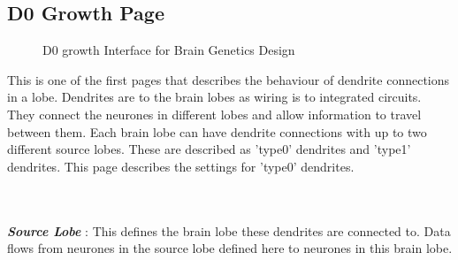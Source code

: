 \documentclass[11pt,twoside,a4paper]{article}
\begin{document}
\subsection{D0 Growth Page}

\begin{minipage}{0.6\linewidth}
\begin{figure}[H]
	\centerline {} %
	\caption{D0 growth Interface for Brain Genetics Design}
	\label{fig:brain_d0growth}
\end{figure}
\end{minipage}
\begin{minipage}{0.1\linewidth}\end{minipage}
\begin{minipage}{0.4\linewidth}
This is one of the first pages that describes the behaviour of dendrite connections in a lobe. Dendrites are to the brain lobes as wiring is to integrated circuits. They connect the neurones in different lobes and allow information to travel between them. Each brain lobe can have dendrite connections with up to two different source lobes. These are described as 'type0' dendrites and 'type1' dendrites. This page describes the settings for 'type0' dendrites.
\end{minipage}~\\~\\


\textbf{\textit{Source Lobe}} : This defines the brain lobe these dendrites are connected to. Data flows from neurones in the source lobe defined here to neurones in this brain lobe. ~\\ %
\end{document}
